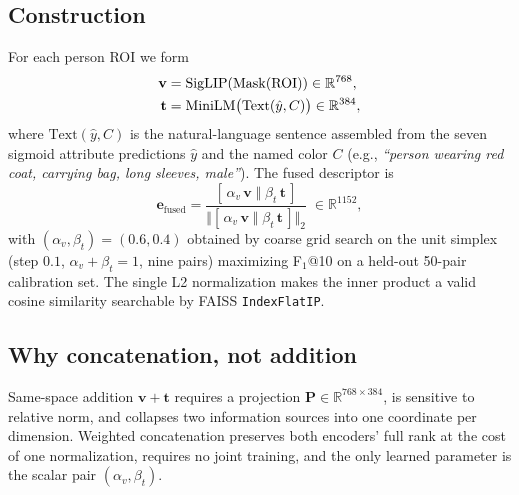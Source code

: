 ﻿\documentclass[conference]{IEEEtran}
\theoremstyle{definition}
\begin{document}
\subsection{Construction}
For each person ROI we form
\begin{align}
\mathbf{v} &= \mathrm{SigLIP}(\mathrm{Mask}(\mathrm{ROI})) \in\mathbb{R}^{768}, \notag\\
\mathbf{t} &= \mathrm{MiniLM}\bigl(\mathrm{Text}(\hat{y}, C)\bigr) \in\mathbb{R}^{384},
\end{align}
where $\mathrm{Text}(\hat{y}, C)$ is the natural-language sentence assembled from the seven sigmoid attribute predictions $\hat{y}$ and the named color $C$ (e.g., \textit{``person wearing red coat, carrying bag, long sleeves, male''}). The fused descriptor is
\begin{equation}
\mathbf{e}_{\text{fused}} = \frac{[\,\alpha_v\,\mathbf{v}\;\Vert\;\beta_t\,\mathbf{t}\,]}{\bigl\Vert [\,\alpha_v\,\mathbf{v}\;\Vert\;\beta_t\,\mathbf{t}\,]\bigr\Vert_2}\;\in\mathbb{R}^{1152},
\label{eq:fusion}
\end{equation}
with $(\alpha_v,\beta_t)=(0.6, 0.4)$ obtained by coarse grid search on the unit simplex (step $0.1$, $\alpha_v+\beta_t=1$, nine pairs) maximizing F$_1$@10 on a held-out 50-pair calibration set. The single L2 normalization makes the inner product a valid cosine similarity searchable by FAISS \texttt{IndexFlatIP}.

\subsection{Why concatenation, not addition}
Same-space addition $\mathbf{v}+\mathbf{t}$ requires a projection $\mathbf{P}\in\mathbb{R}^{768\times 384}$, is sensitive to relative norm, and collapses two information sources into one coordinate per dimension. Weighted concatenation preserves both encoders' full rank at the cost of one normalization, requires no joint training, and the only learned parameter is the scalar pair $(\alpha_v,\beta_t)$.
\end{document}
